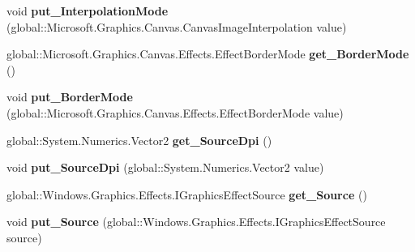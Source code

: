\begin{DoxyCompactItemize}
void {\bfseries put\+\_\+\+Interpolation\+Mode} (global\+::\+Microsoft.\+Graphics.\+Canvas.\+Canvas\+Image\+Interpolation value)
\item 
\mbox{\label{class_microsoft_1_1_graphics_1_1_canvas_1_1_effects_1_1_dpi_compensation_effect_a5640110355a62fb5ce7b280be6b2ead4}} 
global\+::\+Microsoft.\+Graphics.\+Canvas.\+Effects.\+Effect\+Border\+Mode {\bfseries get\+\_\+\+Border\+Mode} ()
\item 
\mbox{\label{class_microsoft_1_1_graphics_1_1_canvas_1_1_effects_1_1_dpi_compensation_effect_a2dbdf38c149aa690fe383653db643db6}} 
void {\bfseries put\+\_\+\+Border\+Mode} (global\+::\+Microsoft.\+Graphics.\+Canvas.\+Effects.\+Effect\+Border\+Mode value)
\item 
\mbox{\label{class_microsoft_1_1_graphics_1_1_canvas_1_1_effects_1_1_dpi_compensation_effect_aba9725fe6d69bf324f59bb8c77745665}} 
global\+::\+System.\+Numerics.\+Vector2 {\bfseries get\+\_\+\+Source\+Dpi} ()
\item 
\mbox{\label{class_microsoft_1_1_graphics_1_1_canvas_1_1_effects_1_1_dpi_compensation_effect_ae562d1d30976c9ba693a67de919e272a}} 
void {\bfseries put\+\_\+\+Source\+Dpi} (global\+::\+System.\+Numerics.\+Vector2 value)
\item 
\mbox{\label{class_microsoft_1_1_graphics_1_1_canvas_1_1_effects_1_1_dpi_compensation_effect_ad4e3622fd4c21cbed4bbc30f5bca8e6c}} 
global\+::\+Windows.\+Graphics.\+Effects.\+I\+Graphics\+Effect\+Source {\bfseries get\+\_\+\+Source} ()
\item 
\mbox{\label{class_microsoft_1_1_graphics_1_1_canvas_1_1_effects_1_1_dpi_compensation_effect_a9757cf2afe58883b620d18466fa4301f}} 
void {\bfseries put\+\_\+\+Source} (global\+::\+Windows.\+Graphics.\+Effects.\+I\+Graphics\+Effect\+Source source)
\item 

\end{DoxyCompactItemize}
